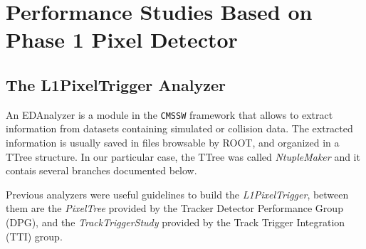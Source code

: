 \documentclass[a4paper,12pt,oneside]{article}
\newcommand{\exodiboson} {\textsc{exodiboson}\xspace}
\begin{document}




\section{Performance Studies Based on Phase 1 Pixel Detector}

        \subsection{The L1PixelTrigger Analyzer}
        An EDAnalyzer is a module in the \texttt{CMSSW} framework that allows to extract information from datasets containing simulated or collision data. The extracted information is usually saved in files browsable by ROOT, and organized in a TTree structure. In our particular case, the TTree was called \textit{NtupleMaker} and it contais several branches documented below.

Previous analyzers were useful guidelines to build the \textit{L1PixelTrigger}, between them are the \textit{PixelTree} provided by the Tracker Detector Performance Group (DPG), and the \textit{TrackTriggerStudy} provided by the Track Trigger Integration (TTI) group. 
\end{document}
